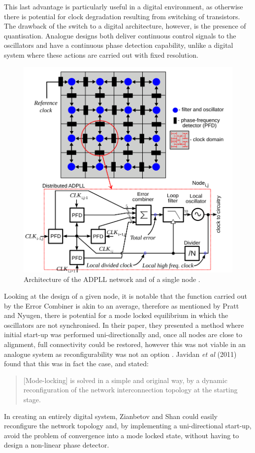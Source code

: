This last advantage is particularly useful in a digital environment, as otherwise there is potential for clock degradation resulting from switching of transistors. The drawback of the switch to a digital architecture, however, is the presence of quantisation. Analogue designs both deliver continuous control signals to the oscillators and have a continuous phase detection capability, unlike a digital system where these actions are carried out with fixed resolution.
\begin{figure}[!h]
	\centering
	\includegraphics[scale=0.4]{../ccirc_2013_arch}
	\caption[Architecture of the ADPLL network and of a single node]{Architecture of the ADPLL network and of a single node \cite{zianbetov2013distributed}.}
	\label{fig:eldar_node}
\end{figure}
Looking at the design of a given node, it is notable that the function carried out by the Error Combiner is akin to an average, therefore as mentioned by Pratt and Nyugen, there is potential for a mode locked equilibrium in which the oscillators are not synchronised. In their paper, they presented a method where initial start-up was performed uni-directionally and, once all nodes are close to alignment, full connectivity could be restored, however this was not viable in an analogue system as reconfigurability was not an option \cite{pratt1995distributed}. Javidan \textit{et al} (2011) found that this was in fact the case, and stated:
\begin{quote}
	[Mode-locking] is solved in a simple and original way, by a dynamic reconfiguration of the network interconnection topology at the starting stage.
\end{quote}
In creating an entirely digital system, Zianbetov and Shan could easily reconfigure the network topology and, by implementing a uni-directional start-up, avoid the problem of convergence into a mode locked state, without having to design a non-linear phase detector.

